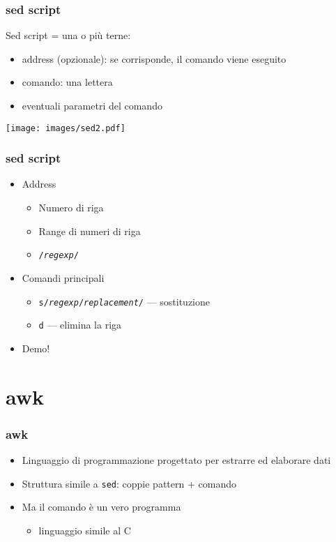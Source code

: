 \documentclass[xetex,table]{beamer}
\begin{document}
\begin{frame}
  \frametitle{sed script}
  Sed script = una o più terne:
  \begin{itemize}
  \item address (opzionale): se corrisponde, il comando viene eseguito
  \item comando: una lettera
  \item eventuali parametri del comando
  \end{itemize}
  \begin{center}
    \texttt{[image: images/sed2.pdf]}
  \end{center}
\end{frame}

\begin{frame}
  \frametitle{sed script}
  \begin{itemize}
  \item Address
    \begin{itemize}
    \item Numero di riga
    \item Range di numeri di riga
    \item \texttt{/{\em regexp}/}
    \end{itemize}
  \item Comandi principali
    \begin{itemize}
    \item \texttt{s/\emph{regexp}/\emph{replacement}/} --- sostituzione
    \item \texttt{d} --- elimina la riga
    \end{itemize}
  \item Demo!
  \end{itemize}
\end{frame}

\section{awk}

\begin{frame}
  \frametitle{awk}
  \begin{itemize}
  \item Linguaggio di programmazione progettato per estrarre ed
    elaborare dati
  \item Struttura simile a \texttt{sed}: coppie pattern + comando
  \item Ma il comando è un vero programma
    \begin{itemize}
    \item linguaggio simile al C
    \end{itemize}
  \end{itemize}
\end{frame}
\end{document}
